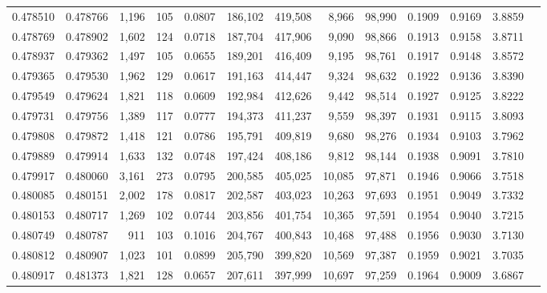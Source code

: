 \begin{tabular}{rrrrrrrrrrrrr}
0.478510 & 0.478766 & 1,196 &   105 &                                     0.0807 & 186,102 & 419,508 &   8,966 &  98,990 & 0.1909 & 0.9169 & 3.8859 \\
0.478769 & 0.478902 & 1,602 &   124 &                                     0.0718 & 187,704 & 417,906 &   9,090 &  98,866 & 0.1913 & 0.9158 & 3.8711 \\
0.478937 & 0.479362 & 1,497 &   105 &                                     0.0655 & 189,201 & 416,409 &   9,195 &  98,761 & 0.1917 & 0.9148 & 3.8572 \\
0.479365 & 0.479530 & 1,962 &   129 &                                     0.0617 & 191,163 & 414,447 &   9,324 &  98,632 & 0.1922 & 0.9136 & 3.8390 \\
0.479549 & 0.479624 & 1,821 &   118 &                                     0.0609 & 192,984 & 412,626 &   9,442 &  98,514 & 0.1927 & 0.9125 & 3.8222 \\
0.479731 & 0.479756 & 1,389 &   117 &                                     0.0777 & 194,373 & 411,237 &   9,559 &  98,397 & 0.1931 & 0.9115 & 3.8093 \\
0.479808 & 0.479872 & 1,418 &   121 &                                     0.0786 & 195,791 & 409,819 &   9,680 &  98,276 & 0.1934 & 0.9103 & 3.7962 \\
0.479889 & 0.479914 & 1,633 &   132 &                                     0.0748 & 197,424 & 408,186 &   9,812 &  98,144 & 0.1938 & 0.9091 & 3.7810 \\
0.479917 & 0.480060 & 3,161 &   273 &                                     0.0795 & 200,585 & 405,025 &  10,085 &  97,871 & 0.1946 & 0.9066 & 3.7518 \\
0.480085 & 0.480151 & 2,002 &   178 &                                     0.0817 & 202,587 & 403,023 &  10,263 &  97,693 & 0.1951 & 0.9049 & 3.7332 \\
0.480153 & 0.480717 & 1,269 &   102 &                                     0.0744 & 203,856 & 401,754 &  10,365 &  97,591 & 0.1954 & 0.9040 & 3.7215 \\
0.480749 & 0.480787 &   911 &   103 &                                     0.1016 & 204,767 & 400,843 &  10,468 &  97,488 & 0.1956 & 0.9030 & 3.7130 \\
0.480812 & 0.480907 & 1,023 &   101 &                                     0.0899 & 205,790 & 399,820 &  10,569 &  97,387 & 0.1959 & 0.9021 & 3.7035 \\
0.480917 & 0.481373 & 1,821 &   128 &                                     0.0657 & 207,611 & 397,999 &  10,697 &  97,259 & 0.1964 & 0.9009 & 3.6867 \\

\end{tabular}
